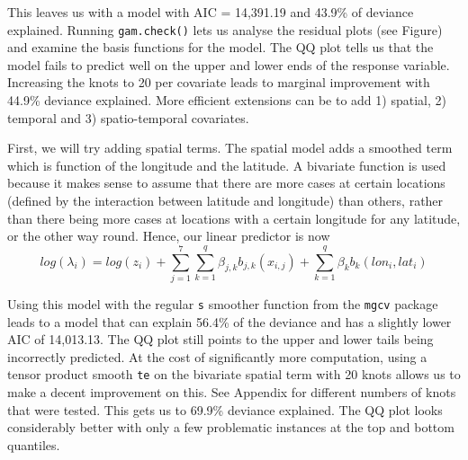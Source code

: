 \documentclass{article}
\begin{document}
This leaves us with a model with AIC = 14,391.19 and 43.9\% of deviance explained. Running \texttt{gam.check()} lets us analyse the residual plots (see Figure) and examine the basis functions for the model. The QQ plot tells us that the model fails to predict well on the upper and lower ends of the response variable. Increasing the knots to 20 per covariate leads to marginal improvement with 44.9\% deviance explained. More efficient extensions can be to add 1) spatial, 2) temporal and 3) spatio-temporal covariates.
\newline

First, we will try adding spatial terms. The spatial model adds a smoothed term which is function of the longitude and the latitude. A bivariate function is used because it makes sense to assume that there are more cases at certain locations (defined by the interaction between latitude and longitude) than others, rather than there being more cases at
locations with a certain longitude for any latitude, or the other way round. Hence, our linear predictor is now
$$
log(\lambda_i) = log(z_i) +  \sum_{j=1}^{7}\sum_{k=1}^{q}\beta_{j,k}b_{j,k}(x_{i,j}) + \sum_{k=1}^{q}\beta_{k}b_{k}(lon_i , lat_i) 
$$
\newline

Using this model with the regular \texttt{s} smoother function from the \texttt{mgcv} package leads to a model that can explain 56.4\% of the deviance and has a slightly lower AIC of 14,013.13. The QQ plot still points to the upper and lower tails being incorrectly predicted. At the cost of significantly more computation, using a tensor product smooth \texttt{te} on the bivariate spatial term with 20 knots allows us to make a decent improvement on this. See Appendix for different numbers of knots that were tested. This gets us to 69.9\% deviance explained. The QQ plot looks considerably better with only a few problematic instances at the top and bottom quantiles.
\end{document}
